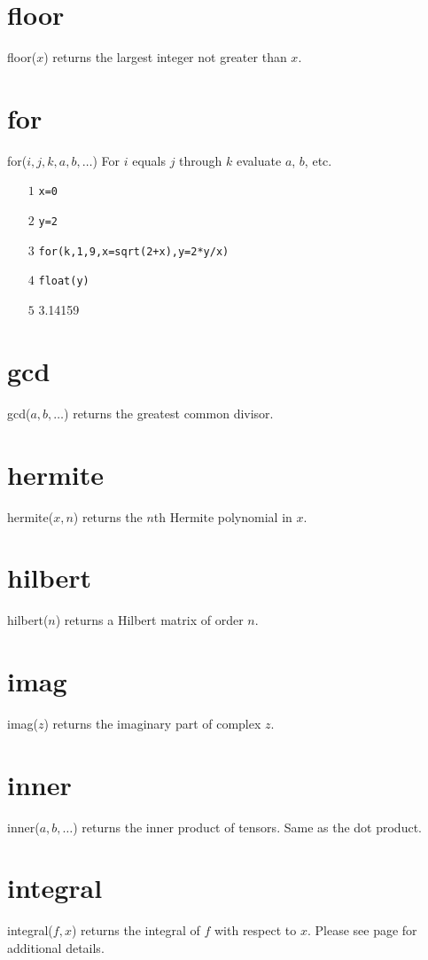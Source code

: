 \documentclass[12pt,openany]{report}
\begin{document}
\section*{floor}
floor($x$) returns the largest integer not greater than $x$.

\section*{for}
for($i,j,k,a,b,\ldots$) For $i$ equals $j$ through $k$ evaluate $a$, $b$, etc.
\begin{itemize}
\item[$\scriptstyle1$]{\tt x=0}
\item[$\scriptstyle2$]{\tt y=2}
\item[$\scriptstyle3$]{\tt for(k,1,9,x=sqrt(2+x),y=2*y/x)}
\item[$\scriptstyle4$]{\tt float(y)}
\item[$\scriptstyle5$]\hspace{50pt} 3.14159
\end{itemize}

\section*{gcd}
gcd($a,b,\ldots$) returns the greatest common divisor.

\section*{hermite}
hermite($x,n$) returns the $n$th Hermite polynomial in $x$.

\section*{hilbert}
hilbert($n$) returns a Hilbert matrix of order $n$.

\section*{imag}
imag($z$) returns the imaginary part of complex $z$.

\section*{inner}
inner($a,b,\ldots$) returns the inner product of tensors.
Same as the dot product.

\section*{integral}
integral($f,x$) returns the integral of $f$ with respect to $x$.
Please see page \pageref{integral} for additional details.
\end{document}
